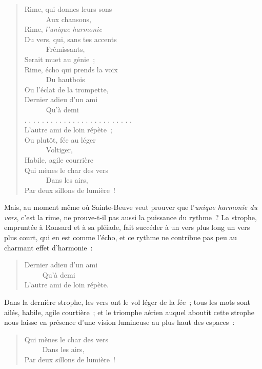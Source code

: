 \documentclass[french,twoside]{book} %
\begin{document}
\begin{verse}
Rime, qui donnes leurs sons\\
      Aux chansons,\\
Rime, \emph{l’unique harmonie}\\
Du vers, qui, sans tes accents\\
      Frémissants,\\
Serait muet au génie ;\\
Rime, écho qui prends la voix\\
      Du hautbois\\
Ou l’éclat de la trompette,\\
Dernier adieu d’un ami\\
      Qu’à demi\\
. . . . . . . . . . . . . . . . . . . . . . . . .\\
L’autre ami de loin répète ;\\
Ou plutôt, fée au léger\\
      Voltiger,\\
Habile, agile courrière\\
Qui mènes le char des vers\\
      Dans les airs,\\
Par deux sillons de lumière !\\
\end{verse}

\noindent Mais, au moment même où Sainte-Beuve veut prouver que l’\emph{unique harmonie du vers}, c’est la rime, ne prouve-t-il pas aussi la puissance du rythme ? La strophe, empruntée à Ronsard et à sa pléiade, fait succéder à un vers plus long un vers plus court, qui en est comme l’écho, et ce rythme ne contribue pas peu au charmant effet d’harmonie :\par


\begin{verse}
Dernier adieu d’un ami\\
     Qu’à demi\\
L’autre ami de loin répète.\\
\end{verse}

\noindent Dans la dernière strophe, les vers ont le vol léger de la fée ; tous les mots sont ailés, habile, agile courtière ; et le triomphe aérien auquel aboutit cette strophe nous laisse en présence d’une vision lumineuse au plus haut des espaces :\par


\begin{verse}
Qui mènes le char des vers\\
     Dans les airs,\\
Par deux sillons de lumière !\\
\end{verse}
\end{document}
